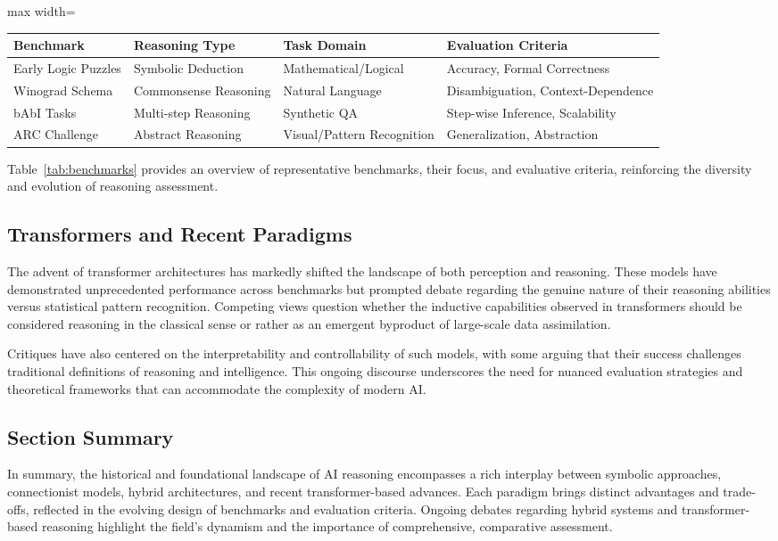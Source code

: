 \documentclass[sigconf]{acmart}
\begin{document}
\begin{table*}[htbp]
\centering
\caption{Key Benchmarks in AI Reasoning and Their Evaluative Focus}
\label{tab:benchmarks}
\begin{adjustbox}{max width=\textwidth}
\begin{tabular}{@{}llll@{}}
\toprule
Benchmark & Reasoning Type & Task Domain & Evaluation Criteria \\
\midrule
Early Logic Puzzles & Symbolic Deduction & Mathematical/Logical & Accuracy, Formal Correctness \\
Winograd Schema & Commonsense Reasoning & Natural Language & Disambiguation, Context-Dependence \\
bAbI Tasks & Multi-step Reasoning & Synthetic QA & Step-wise Inference, Scalability \\
ARC Challenge & Abstract Reasoning & Visual/Pattern Recognition & Generalization, Abstraction \\
\bottomrule
\end{tabular}
\end{adjustbox}
\end{table*}

Table~\ref{tab:benchmarks} provides an overview of representative benchmarks, their focus, and evaluative criteria, reinforcing the diversity and evolution of reasoning assessment.

\subsection{Transformers and Recent Paradigms}
The advent of transformer architectures has markedly shifted the landscape of both perception and reasoning. These models have demonstrated unprecedented performance across benchmarks but prompted debate regarding the genuine nature of their reasoning abilities versus statistical pattern recognition. Competing views question whether the inductive capabilities observed in transformers should be considered reasoning in the classical sense or rather as an emergent byproduct of large-scale data assimilation.

Critiques have also centered on the interpretability and controllability of such models, with some arguing that their success challenges traditional definitions of reasoning and intelligence. This ongoing discourse underscores the need for nuanced evaluation strategies and theoretical frameworks that can accommodate the complexity of modern AI.

\subsection{Section Summary}
In summary, the historical and foundational landscape of AI reasoning encompasses a rich interplay between symbolic approaches, connectionist models, hybrid architectures, and recent transformer-based advances. Each paradigm brings distinct advantages and trade-offs, reflected in the evolving design of benchmarks and evaluation criteria. Ongoing debates regarding hybrid systems and transformer-based reasoning highlight the field's dynamism and the importance of comprehensive, comparative assessment.
\end{document}
